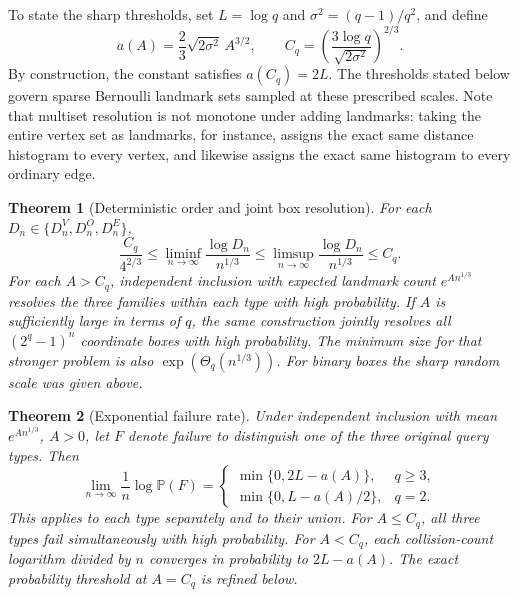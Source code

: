 \documentclass[11pt]{article}
\newtheorem{theorem}{Theorem}
\theoremstyle{definition}
\newcommand{\prob}{\mathbb P}
\newcommand{\whp}{with high probability}
\begin{document}
To state the sharp thresholds, set \(L=\log q\) and \(\sigma^2=(q-1)/q^2\), and define
\[
a(A)=\frac23\sqrt{2\sigma^2}\,A^{3/2},
\qquad C_q=\left(\frac{3\log q}{\sqrt{2\sigma^2}}\right)^{2/3}.
\]
By construction, the constant satisfies \(a(C_q)=2L\). The thresholds stated below govern sparse Bernoulli landmark sets sampled at these prescribed scales. Note that multiset resolution is not monotone under adding landmarks: taking the entire vertex set as landmarks, for instance, assigns the exact same distance histogram to every vertex, and likewise assigns the exact same histogram to every ordinary edge.

\begin{theorem}[Deterministic order and joint box resolution]\label{thm:order}
For each \(D_n\in\{D^V_n,D^O_n,D^E_n\}\),
\[
\frac{C_q}{4^{2/3}}
 \le \liminf_{n\to\infty}\frac{\log D_n}{n^{1/3}}
 \le \limsup_{n\to\infty}\frac{\log D_n}{n^{1/3}}
 \le C_q.
\]
For each \(A>C_q\), independent inclusion with expected landmark count \(e^{A n^{1/3}}\) resolves the three families within each type \whp. If \(A\) is sufficiently large in terms of \(q\), the same construction jointly resolves all \((2^q-1)^n\) coordinate boxes \whp. The minimum size for that stronger problem is also \(\exp(\Theta_q(n^{1/3}))\). For binary boxes the sharp random scale was given above.
\end{theorem}

\begin{theorem}[Exponential failure rate]\label{thm:failure}
Under independent inclusion with mean \(e^{A n^{1/3}}\), \(A>0\), let \(F\) denote failure to distinguish one of the three original query types. Then
\[
\lim_{n\to\infty}\frac1n\log\prob(F)=
\begin{cases}
\min\{0,2L-a(A)\},&q\ge3,\\
\min\{0,L-a(A)/2\},&q=2.
\end{cases}
\]
This applies to each type separately and to their union. For \(A\le C_q\), all three types fail simultaneously \whp. For \(A<C_q\), each collision-count logarithm divided by \(n\) converges in probability to \(2L-a(A)\). The exact probability threshold at \(A=C_q\) is refined below.
\end{theorem}
\end{document}
